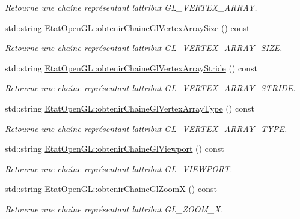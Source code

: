 \begin{DoxyCompactItemize}
\begin{DoxyCompactList}\small\item\em Retourne une chaîne représentant l\textquotesingle{}attribut G\+L\+\_\+\+V\+E\+R\+T\+E\+X\+\_\+\+A\+R\+R\+A\+Y. \end{DoxyCompactList}\item 
std\+::string \hyperlink{group__utilitaire_ga5475c8155f182e7c018cca2f6124f746}{Etat\+Open\+G\+L\+::obtenir\+Chaine\+Gl\+Vertex\+Array\+Size} () const 
\begin{DoxyCompactList}\small\item\em Retourne une chaîne représentant l\textquotesingle{}attribut G\+L\+\_\+\+V\+E\+R\+T\+E\+X\+\_\+\+A\+R\+R\+A\+Y\+\_\+\+S\+I\+Z\+E. \end{DoxyCompactList}\item 
std\+::string \hyperlink{group__utilitaire_ga7830e4ba0be698e54d824a5c6a430f5d}{Etat\+Open\+G\+L\+::obtenir\+Chaine\+Gl\+Vertex\+Array\+Stride} () const 
\begin{DoxyCompactList}\small\item\em Retourne une chaîne représentant l\textquotesingle{}attribut G\+L\+\_\+\+V\+E\+R\+T\+E\+X\+\_\+\+A\+R\+R\+A\+Y\+\_\+\+S\+T\+R\+I\+D\+E. \end{DoxyCompactList}\item 
std\+::string \hyperlink{group__utilitaire_ga27df79ce6a4279f818c5cd041e8dc6bd}{Etat\+Open\+G\+L\+::obtenir\+Chaine\+Gl\+Vertex\+Array\+Type} () const 
\begin{DoxyCompactList}\small\item\em Retourne une chaîne représentant l\textquotesingle{}attribut G\+L\+\_\+\+V\+E\+R\+T\+E\+X\+\_\+\+A\+R\+R\+A\+Y\+\_\+\+T\+Y\+P\+E. \end{DoxyCompactList}\item 
std\+::string \hyperlink{group__utilitaire_ga6afc9840c8a03deb6d741843bf82d28d}{Etat\+Open\+G\+L\+::obtenir\+Chaine\+Gl\+Viewport} () const 
\begin{DoxyCompactList}\small\item\em Retourne une chaîne représentant l\textquotesingle{}attribut G\+L\+\_\+\+V\+I\+E\+W\+P\+O\+R\+T. \end{DoxyCompactList}\item 
std\+::string \hyperlink{group__utilitaire_ga8ca35baf35a77d201c5a770a22aedbe8}{Etat\+Open\+G\+L\+::obtenir\+Chaine\+Gl\+Zoom\+X} () const 
\begin{DoxyCompactList}\small\item\em Retourne une chaîne représentant l\textquotesingle{}attribut G\+L\+\_\+\+Z\+O\+O\+M\+\_\+\+X. \end{DoxyCompactList}\item 

\end{DoxyCompactItemize}

